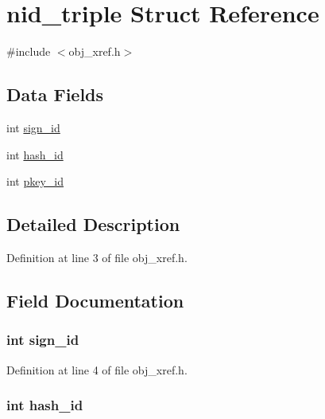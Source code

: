 \hypertarget{structnid__triple}{}\section{nid\+\_\+triple Struct Reference}
\label{structnid__triple}


{\ttfamily \#include $<$obj\+\_\+xref.\+h$>$}

\subsection*{Data Fields}
\begin{DoxyCompactItemize}
\item 
int \hyperlink{structnid__triple_a2dc7b4f2733c5728ed92475b8829af97}{sign\+\_\+id}
\item 
int \hyperlink{structnid__triple_a7333f07fec442136689219a538b36bf8}{hash\+\_\+id}
\item 
int \hyperlink{structnid__triple_a1021097b3af14d7ae24a3756def116d2}{pkey\+\_\+id}
\end{DoxyCompactItemize}


\subsection{Detailed Description}


Definition at line 3 of file obj\+\_\+xref.\+h.



\subsection{Field Documentation}
\subsubsection[{\texorpdfstring{sign\+\_\+id}{sign_id}}]{\setlength{\rightskip}{0pt plus 5cm}int sign\+\_\+id}\hypertarget{structnid__triple_a2dc7b4f2733c5728ed92475b8829af97}{}\label{structnid__triple_a2dc7b4f2733c5728ed92475b8829af97}


Definition at line 4 of file obj\+\_\+xref.\+h.

\subsubsection[{\texorpdfstring{hash\+\_\+id}{hash_id}}]{\setlength{\rightskip}{0pt plus 5cm}int hash\+\_\+id}\hypertarget{structnid__triple_a7333f07fec442136689219a538b36bf8}{}\label{structnid__triple_a7333f07fec442136689219a538b36bf8}



